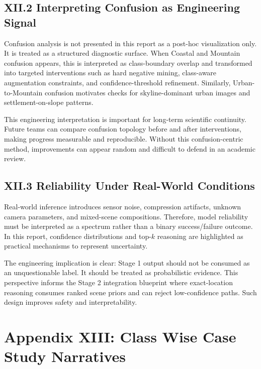 \subsection*{XII.2 Interpreting Confusion as Engineering Signal}
Confusion analysis is not presented in this report as a post-hoc visualization only. It is treated as a structured diagnostic surface. When Coastal and Mountain confusion appears, this is interpreted as class-boundary overlap and transformed into targeted interventions such as hard negative mining, class-aware augmentation constraints, and confidence-threshold refinement. Similarly, Urban-to-Mountain confusion motivates checks for skyline-dominant urban images and settlement-on-slope patterns.

This engineering interpretation is important for long-term scientific continuity. Future teams can compare confusion topology before and after interventions, making progress measurable and reproducible. Without this confusion-centric method, improvements can appear random and difficult to defend in an academic review.

\subsection*{XII.3 Reliability Under Real-World Conditions}
Real-world inference introduces sensor noise, compression artifacts, unknown camera parameters, and mixed-scene compositions. Therefore, model reliability must be interpreted as a spectrum rather than a binary success/failure outcome. In this report, confidence distributions and top-$k$ reasoning are highlighted as practical mechanisms to represent uncertainty.

The engineering implication is clear: Stage 1 output should not be consumed as an unquestionable label. It should be treated as probabilistic evidence. This perspective informs the Stage 2 integration blueprint where exact-location reasoning consumes ranked scene priors and can reject low-confidence paths. Such design improves safety and interpretability.

\section*{Appendix XIII: Class Wise Case Study Narratives}

